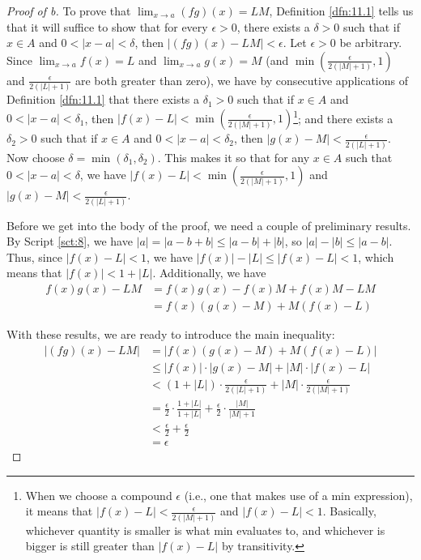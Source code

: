 \documentclass[../main.tex]{subfiles}
\begin{document}
\begin{theorem}
\begin{proof}[Proof of b]
        To prove that $\lim_{x\to a}(fg)(x)=LM$, Definition \ref{dfn:11.1} tells us that it will suffice to show that for every $\epsilon>0$, there exists a $\delta>0$ such that if $x\in A$ and $0<|x-a|<\delta$, then $|(fg)(x)-LM|<\epsilon$. Let $\epsilon>0$ be arbitrary. Since $\lim_{x\to a}f(x)=L$ and $\lim_{x\to a}g(x)=M$ (and $\min(\frac{\epsilon}{2(|M|+1)},1)$ and $\frac{\epsilon}{2(|L|+1)}$ are both greater than zero), we have by consecutive applications of Definition \ref{dfn:11.1} that there exists a $\delta_1>0$ such that if $x\in A$ and $0<|x-a|<\delta_1$, then $|f(x)-L|<\min(\frac{\epsilon}{2(|M|+1)},1)$\footnote{When we choose a compound $\epsilon$ (i.e., one that makes use of a min expression), it means that $|f(x)-L|<\frac{\epsilon}{2(|M|+1)}$ and $|f(x)-L|<1$. Basically, whichever quantity is smaller is what min evaluates to, and whichever is bigger is still greater than $|f(x)-L|$ by transitivity.}; and there exists a $\delta_2>0$ such that if $x\in A$ and $0<|x-a|<\delta_2$, then $|g(x)-M|<\frac{\epsilon}{2(|L|+1)}$. Now choose $\delta=\min(\delta_1,\delta_2)$. This makes it so that for any $x\in A$ such that $0<|x-a|<\delta$, we have $|f(x)-L|<\min(\frac{\epsilon}{2(|M|+1)},1)$ and $|g(x)-M|<\frac{\epsilon}{2(|L|+1)}$.\par
        Before we get into the body of the proof, we need a couple of preliminary results. By Script \ref{sct:8}, we have $|a|=|a-b+b|\leq|a-b|+|b|$, so $|a|-|b|\leq|a-b|$. Thus, since $|f(x)-L|<1$, we have $|f(x)|-|L|\leq|f(x)-L|<1$, which means that $|f(x)|<1+|L|$. Additionally, we have
        \begin{align*}
            f(x)g(x)-LM &= f(x)g(x)-f(x)M+f(x)M-LM\\
            &= f(x)(g(x)-M)+M(f(x)-L)
        \end{align*}\par
        With these results, we are ready to introduce the main inequality:
        \begin{align*}
            |(fg)(x)-LM| &= |f(x)(g(x)-M)+M(f(x)-L)|\\
            &\leq |f(x)|\cdot|g(x)-M|+|M|\cdot|f(x)-L|\\
            &< (1+|L|)\cdot\frac{\epsilon}{2(|L|+1)}+|M|\cdot\frac{\epsilon}{2(|M|+1)}\\
            &= \frac{\epsilon}{2}\cdot\frac{1+|L|}{1+|L|}+\frac{\epsilon}{2}\cdot\frac{|M|}{|M|+1}\\
            &< \frac{\epsilon}{2}+\frac{\epsilon}{2}\\
            &= \epsilon

\end{align*}
\end{proof}
\end{theorem}
\end{document}
